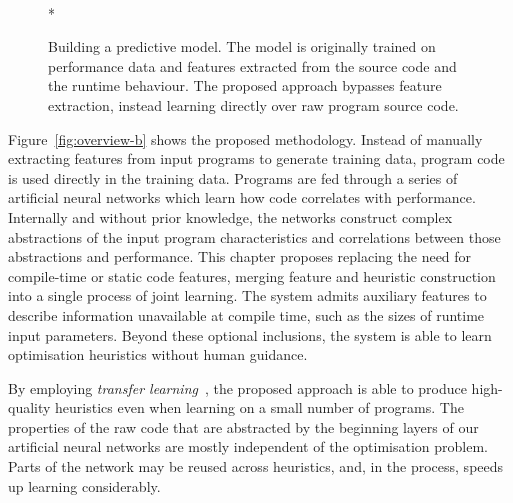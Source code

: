 \begin{figure}[t!]
	\centering
	\\*%
	\caption[Using machine learning for compiler optimisations]{%
		Building a predictive model. The model is originally trained on performance data and features extracted from the source code and the runtime behaviour. The proposed approach bypasses feature extraction, instead learning directly over raw program source code.%
	}%
	\label{fig:overview}
\end{figure}

Figure~\ref{fig:overview-b} shows the proposed methodology. Instead of manually extracting features from input programs to generate training data, program code is used directly in the training data. Programs are fed through a series of artificial neural networks which learn how code correlates with performance. Internally and without prior knowledge, the networks construct complex abstractions of the input program characteristics and correlations between those abstractions and performance. This chapter proposes replacing the need for compile-time or static code features, merging feature and heuristic construction into a single process of joint learning. The system admits auxiliary features to describe information unavailable at compile time, such as the sizes of runtime input parameters. Beyond these optional inclusions, the system is able to learn optimisation heuristics without human guidance.

By employing \emph{transfer learning}~\cite{Yosinski2014}, the proposed approach is able to produce high-quality heuristics even when learning on a small number of programs. The properties of the raw code that are abstracted by the beginning layers of our artificial neural networks are mostly independent of the optimisation problem. Parts of the network may be reused across heuristics, and, in the process, speeds up learning considerably.

